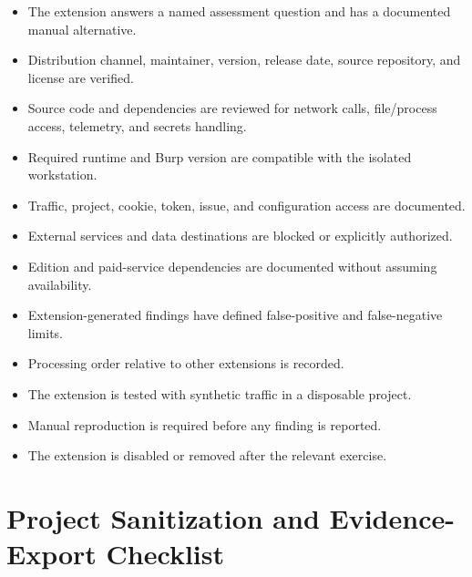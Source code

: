 \documentclass[11pt]{article}
\begin{document}
\begin{itemize}[label=$\square$]
  \item The extension answers a named assessment question and has a documented manual alternative.
  \item Distribution channel, maintainer, version, release date, source repository, and license are verified.
  \item Source code and dependencies are reviewed for network calls, file/process access, telemetry, and secrets handling.
  \item Required runtime and Burp version are compatible with the isolated workstation.
  \item Traffic, project, cookie, token, issue, and configuration access are documented.
  \item External services and data destinations are blocked or explicitly authorized.
  \item Edition and paid-service dependencies are documented without assuming availability.
  \item Extension-generated findings have defined false-positive and false-negative limits.
  \item Processing order relative to other extensions is recorded.
  \item The extension is tested with synthetic traffic in a disposable project.
  \item Manual reproduction is required before any finding is reported.
  \item The extension is disabled or removed after the relevant exercise.
\end{itemize}

\section{Project Sanitization and Evidence-Export Checklist}
\end{document}
